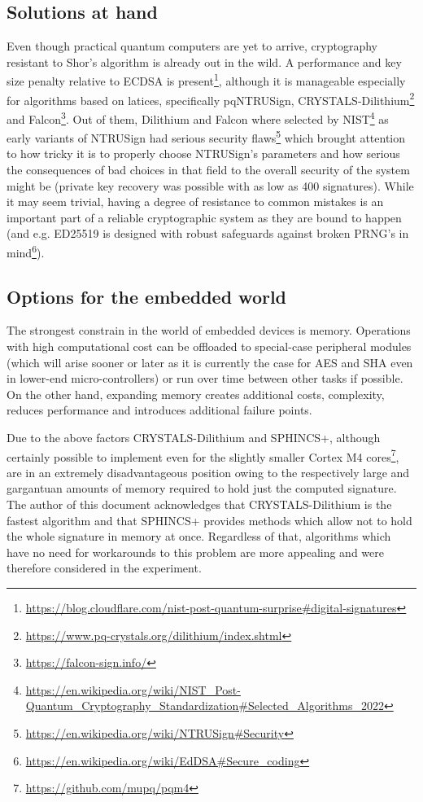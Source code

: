 \documentclass[
]{article}
\begin{document}
\hypertarget{possible-resolutions}{%
\subsection{Solutions at hand}\label{possible-resolutions}}

Even though practical quantum computers are yet to arrive, cryptography resistant to Shor's algorithm is already out in the wild. A performance and key size penalty relative to ECDSA is
present\footnote{\url{https://blog.cloudflare.com/nist-post-quantum-surprise\#digital-signatures}},
although it is manageable especially for algorithms based on latices, specifically pqNTRUSign, CRYSTALS-Dilithium\footnote{\url{https://www.pq-crystals.org/dilithium/index.shtml}} and Falcon\footnote{\url{https://falcon-sign.info/}}.
Out of them, Dilithium and Falcon where selected by NIST\footnote{\url{https://en.wikipedia.org/wiki/NIST_Post-Quantum_Cryptography_Standardization\#Selected_Algorithms_2022}} as early variants of NTRUSign
had serious security flaws\footnote{\url{https://en.wikipedia.org/wiki/NTRUSign\#Security}} which brought
attention to how tricky it is to properly choose NTRUSign's parameters and how serious the consequences
of bad choices in that field to the overall security of the system might be (private key recovery was possible with as low as 400 signatures).
While it may seem trivial, having a degree of resistance to common mistakes is an important part of a reliable cryptographic system as they are bound to happen (and e.g. ED25519 is designed with robust
safeguards against broken PRNG's in mind\footnote{\url{https://en.wikipedia.org/wiki/EdDSA\#Secure_coding}}).

\hypertarget{embedded-options}{%
\subsection{Options for the embedded world}\label{embedded-options}}

The strongest constrain in the world of embedded devices is memory. Operations with high computational
cost can be offloaded to special-case peripheral modules (which will arise sooner or later as it is
currently the case for AES and SHA even in lower-end micro-controllers) or run over time between other
tasks if possible. On the other hand, expanding memory creates additional costs, complexity, reduces
performance and introduces additional failure points.

Due to the above factors CRYSTALS-Dilithium and SPHINCS+, although certainly possible to implement even
for the slightly smaller Cortex M4 cores\footnote{\url{https://github.com/mupq/pqm4}}, are in an
extremely disadvantageous position owing to the respectively large and gargantuan amounts of memory
required to hold just the computed signature. The author of this document acknowledges that CRYSTALS-Dilithium is the fastest algorithm and that SPHINCS+ provides methods which allow not to hold the whole
signature in memory at once. Regardless of that, algorithms which have no need for workarounds to this
problem are more appealing and were therefore considered in the experiment.
\end{document}
